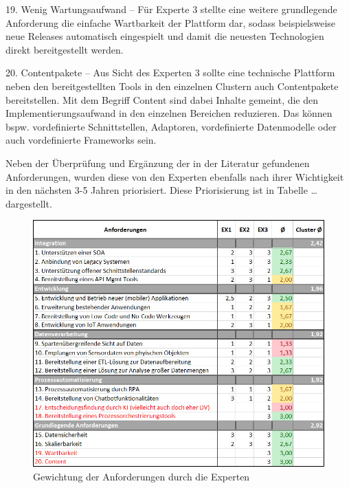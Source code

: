19. Wenig Wartungsaufwand – Für Experte 3 stellte eine weitere grundlegende Anforderung die einfache Wartbarkeit der Plattform dar, sodass beispielsweise neue Releases automatisch eingespielt und damit die neuesten Technologien direkt bereitgestellt werden.

20. Contentpakete – Aus Sicht des Experten 3 sollte eine technische Plattform neben den bereitgestellten Tools in den einzelnen Clustern auch Contentpakete bereitstellen. Mit dem Begriff Content sind dabei Inhalte gemeint, die den Implementierungsaufwand in den einzelnen Bereichen reduzieren. Das können bspw. vordefinierte Schnittstellen, Adaptoren, vordefinierte Datenmodelle oder auch vordefinierte Frameworks sein. 

Neben der Überprüfung und Ergänzung der in der Literatur gefundenen Anforderungen, wurden diese von den Experten ebenfalls nach ihrer Wichtigkeit in den nächsten 3-5 Jahren priorisiert. Diese Priorisierung ist in Tabelle  … dargestellt.

\begin{figure}[h]
    \centering
    \includegraphics[width=1\textwidth]{img/Gewichtung_Anforderung.jpg}
    \caption[Gewichtung der Anforderungen durch die Experten]{Gewichtung der Anforderungen durch die Experten\autocite{Gewichtung}}
    \label{fig:Gewichtung}
\end{figure}

